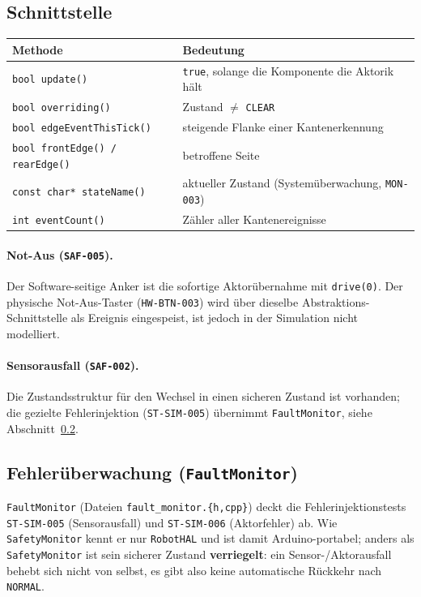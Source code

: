 \documentclass[
  a4paper,
  12pt,
  DIV=12,        %
  parskip=half,  %
  headings=small %
]{scrartcl}
\theoremstyle{definition}
\theoremstyle{definition}
\begin{document}
\subsection{Schnittstelle}\label{safety-schnittstelle}

\begin{longtable}[]{@{}p{}p{}@{}}
\toprule
\textbf{Methode} & \textbf{Bedeutung}\\
\midrule
\endhead
\texttt{bool update()} & \texttt{true}, solange die Komponente die Aktorik hält\\
\texttt{bool overriding()} & Zustand $\neq$ \texttt{CLEAR}\\
\texttt{bool edgeEventThisTick()} & steigende Flanke einer Kantenerkennung\\
\texttt{bool frontEdge() / rearEdge()} & betroffene Seite\\
\texttt{const char* stateName()} & aktueller Zustand (Systemüberwachung, \texttt{MON-003})\\
\texttt{int eventCount()} & Zähler aller Kantenereignisse\\
\bottomrule
\end{longtable}

\paragraph{Not-Aus (\texttt{SAF-005}).} Der Software-seitige Anker ist die
sofortige Aktorübernahme mit \texttt{drive(0)}. Der physische
Not-Aus-Taster (\texttt{HW-BTN-003}) wird über dieselbe
Abstraktions-Schnittstelle als Ereignis eingespeist, ist jedoch in der
Simulation nicht modelliert.

\paragraph{Sensorausfall (\texttt{SAF-002}).} Die Zustandsstruktur für den
Wechsel in einen sicheren Zustand ist vorhanden; die gezielte
Fehlerinjektion (\texttt{ST-SIM-005}) übernimmt \texttt{FaultMonitor},
siehe Abschnitt~\ref{faultmonitor}.

\subsection{Fehlerüberwachung (\texttt{FaultMonitor})}\label{faultmonitor}

\texttt{FaultMonitor} (Dateien \texttt{fault\_monitor.\{h,cpp\}}) deckt die
Fehlerinjektionstests \texttt{ST-SIM-005} (Sensorausfall) und
\texttt{ST-SIM-006} (Aktorfehler) ab. Wie \texttt{SafetyMonitor} kennt er
nur \texttt{RobotHAL} und ist damit Arduino-portabel; anders als
\texttt{SafetyMonitor} ist sein sicherer Zustand \textbf{verriegelt}: ein
Sensor-/Aktorausfall behebt sich nicht von selbst, es gibt also keine
automatische Rückkehr nach \texttt{NORMAL}.
\end{document}
